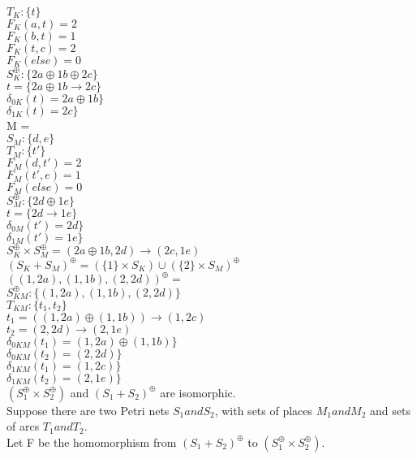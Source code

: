 $T_K :\{t\}$\\  
$F_K (a, t) = 2$\\
$F_K (b, t) = 1$\\
$F_K (t, c) = 2$\\
$F_K (else) = 0$\\
%
$S_K^\oplus :\{ 2a \oplus 1b \oplus 2c\}$\\
$t = \{ 2a \oplus 1b \to 2c \}$\\  
$\delta_{0K} (t) = 2a \oplus 1b \}$\\
$\delta_{1K} (t) = 2c \}$\\
\smallskip
M = \\
$S_M :\{d,e\}$\\
$T_M :\{t'\}$\\  
$F_M (d, t') = 2$\\
$F_M (t', e) = 1$\\
$F_M (else) = 0$\\
%
$S_M^\oplus :\{ 2d \oplus 1e\}$\\
$t = \{ 2d \to 1e \}$\\  
$\delta_{0M} (t') = 2d \}$\\
$\delta_{1M} (t') = 1e \}$\\
\smallskip
$S_K^\oplus \times S_M^\oplus = (2a \oplus 1b, 2d) \to (2c, 1e)$\\
\smallskip
$(S_K + S_M)^\oplus = (\{1\} \times S_K) \cup (\{2\} \times S_M)^\oplus$\\
$((1, 2a), (1, 1b), (2, 2d))^\oplus = $\\
$S_{KM}^\oplus: \{(1, 2a), (1, 1b), (2, 2d) \}$\\
$T_{KM}: \{t_1, t_2\}$\\
$t_1 = ((1, 2a) \oplus (1, 1b)) \to (1, 2c)$\\
$t_2 = (2, 2d) \to (2, 1e)$\\
$\delta_{0KM} (t_1) = (1, 2a) \oplus (1, 1b) \}$\\
$\delta_{0KM} (t_2) = (2, 2d) \}$\\
$\delta_{1KM} (t_1) = (1, 2c) \}$\\
$\delta_{1KM} (t_2) = (2, 1e) \}$\\
\smallskip
$(S_1 ^\oplus \times S_2 ^\oplus)$ and $(S_1 + S_2)^\oplus$ are isomorphic. \\
Suppose there are two Petri nets $S_1 and S_2$, with sets of places $M_1 and M_2$ and sets of arcs $T_1 and T_2.$\\
Let F be the homomorphism from $(S_1 + S_2)^\oplus$ to $(S_1 ^\oplus \times S_2 ^\oplus)$. \\

